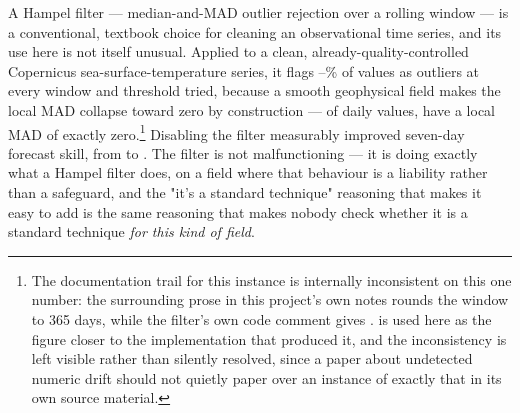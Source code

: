  A Hampel filter --- median-and-MAD outlier rejection over a
rolling window --- is a conventional, textbook choice for cleaning an
observational time series, and its use here is not itself unusual. Applied
to a clean, already-quality-controlled Copernicus sea-surface-temperature
series, it flags \HampelFlagLow{}--\HampelFlagHigh{}\% of values as outliers
at every window and threshold tried, because a smooth geophysical field
makes the local MAD collapse toward zero by construction --- of
\HampelWindow{} daily values, \HampelZeroMAD{} have a local MAD of exactly
zero.\footnote{The documentation trail for this instance is internally
inconsistent on this one number: the surrounding prose in this project's own
notes rounds the window to 365 days, while the filter's own code comment
gives \HampelWindow{}. \HampelWindow{} is used here as the figure closer to
the implementation that produced it, and the inconsistency is left visible
rather than silently resolved, since a paper about undetected numeric drift
should not quietly paper over an instance of exactly that in its own source
material.} Disabling the filter measurably improved seven-day forecast
skill, from \HampelSkillWith{} to \HampelSkillWithout{}. The filter is not
malfunctioning --- it is doing exactly what a Hampel filter does, on a
field where that behaviour is a liability rather than a safeguard, and the
"it's a standard technique" reasoning that makes it easy to add is the same
reasoning that makes nobody check whether it is a standard technique
\emph{for this kind of field}.

